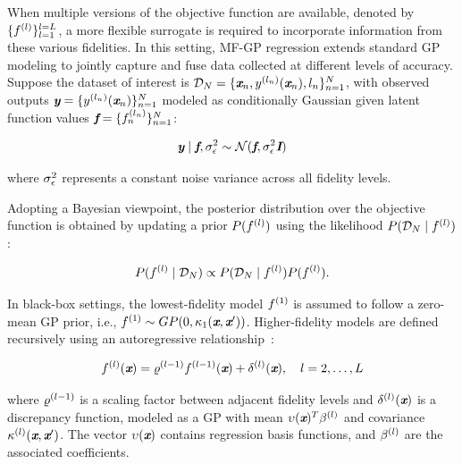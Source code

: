 When multiple versions of the objective function are available, denoted by $\{f^{(l)}\}_{l=1}^{l = L}$, a more flexible surrogate is required to incorporate information from these various fidelities. In this setting, MF-GP regression extends standard GP modeling to jointly capture and fuse data collected at different levels of accuracy. Suppose the dataset of interest is $\mathcal{D}_{N} = \{ \textbf{\em x}_{n}, y^{(l_{n})}(\textbf{\em x}_{n}), l_{n} \}_{n=1}^{N}$, with observed outputs $\textbf{\em y} = \{ y^{(l_{n})}(\textbf{\em x}_{n}) \}_{n=1}^{N}$ modeled as conditionally Gaussian given latent function values $\textbf{\em f} = \{ f^{(l_{n})}_{n} \}_{n=1}^{N}$:

\begin{equation}\label{e:MFGP0}
	\textbf{\em y} \mid \textbf{\em f}, \sigma_{\epsilon}^2 \sim \mathcal{N}(\textbf{\em f}, \sigma_{\epsilon}^2 \textbf{\em I})
\end{equation}

\noindent where $\sigma_{\epsilon}^2$ represents a constant noise variance across all fidelity levels.

Adopting a Bayesian viewpoint, the posterior distribution over the objective function is obtained by updating a prior $P(f^{(l)})$ using the likelihood $P(\mathcal{D}_{N} \mid f^{(l)})$:

\[
	P( f^{(l)} \mid \mathcal{D}_{N}) \propto P(\mathcal{D}_{N} \mid f^{(l)}) P(f^{(l)}).
\]

In black-box settings, the lowest-fidelity model $f^{(1)}$ is assumed to follow a zero-mean GP prior, i.e., $f^{(1)} \sim GP(0, \kappa_1(\textbf{\em x}, \textbf{\em x}'))$. Higher-fidelity models are defined recursively using an autoregressive relationship~\cite{kennedy2000predicting}:

\begin{equation}\label{e:MFGP1}
	f^{(l)}(\textbf{\em x}) = \varrho^{(l-1)} f^{(l - 1)}(\textbf{\em x}) + \delta^{(l)}(\textbf{\em x}), \quad l = 2, \dots, L
\end{equation}

\noindent where $\varrho^{(l-1)}$ is a scaling factor between adjacent fidelity levels and $\delta^{(l)}(\textbf{\em x})$ is a discrepancy function, modeled as a GP with mean $\upsilon(\textbf{\em x})^T \beta^{(l)}$ and covariance $\kappa^{(l)}(\textbf{\em x}, \textbf{\em x}')$. The vector $\upsilon(\textbf{\em x})$ contains regression basis functions, and $\beta^{(l)}$ are the associated coefficients.

